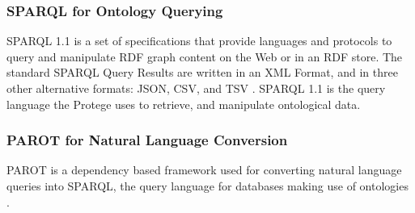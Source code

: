 \subsubsection{SPARQL for Ontology Querying}
SPARQL 1.1 is a set of specifications that provide languages and protocols to query and manipulate RDF graph content on the Web or in an RDF store. The standard SPARQL Query Results are written in an XML Format, and in three other alternative formats: JSON, CSV, and TSV \cite{picalausa2011real}. SPARQL 1.1 is the query language the Protege uses to retrieve, and manipulate ontological data.
\subsubsection{PAROT for Natural Language Conversion}
PAROT is a dependency based framework used for converting natural language queries into SPARQL, the query language for databases making use of ontologies \cite{ochieng2020parot}.